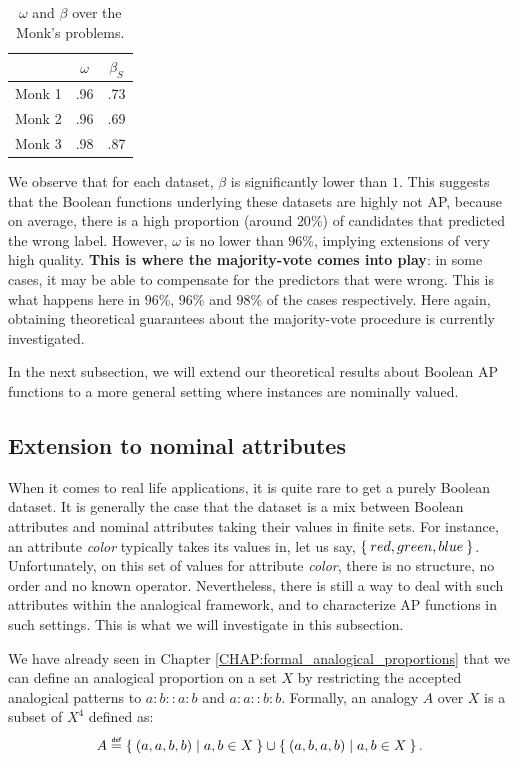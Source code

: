 \begin{table}
\centering
\begin{tabular}{ c  c  c }
\toprule
  & $\omega$  & $\beta_S$ \\
\midrule
Monk 1 & .96 & .73 \\
Monk 2 & .96 & .69 \\
Monk 3 & .98 & .87 \\
\bottomrule
\end{tabular}
\caption{$\omega$ and $\beta$ over the Monk's problems.}
\label{table_monks}
\end{table}

We observe that for each dataset, $\beta$ is significantly lower than $1$.
This suggests that the Boolean functions underlying these datasets are highly
not AP, because on average, there is a high proportion (around $20$\%) of
candidates that predicted the wrong label. However, $\omega$ is no lower than
$96$\%, implying extensions of very high quality.  \textbf{This is where the
majority-vote comes into play}: in some cases, it may be able to compensate for
the predictors that were wrong.  This is what happens here in $96$\%, $96$\%
and $98$\% of the cases respectively. Here again, obtaining theoretical
guarantees about the majority-vote procedure is currently investigated.

In the next subsection, we will extend our theoretical results about Boolean AP
functions to a more general setting where instances are nominally valued.

\subsection{Extension to nominal attributes}
\label{SEC:extension_to_nominal_attributes}

When it comes to real life applications, it is quite rare to get a purely
Boolean dataset.  It is generally the case that the dataset  is  a mix between
Boolean attributes and nominal attributes taking their values in finite sets.
For instance, an attribute \textit{color} typically takes its values in, let us
say, $\Set{red, green,blue}$. Unfortunately, on this set of values for attribute
\textit{color}, there is no structure, no order and no known operator.
Nevertheless, there is still a way to deal with such attributes within the
analogical framework, and to characterize AP functions in such settings. This
is what we will investigate in this subsection.
 

We have already seen in Chapter \ref{CHAP:formal_analogical_proportions} that we
can define an analogical proportion on a set $X$ by restricting the accepted
analogical patterns to $a:b::a:b$ and $a:a::b:b$.  Formally, an analogy $A$
over $X$ is a subset of $X^4$ defined as:
$$A \eqdef \Set{ (a,a,b,b)  | a, b \in X} \cup \Set{ (a,b,a,b) | a, b \in X}.$$

